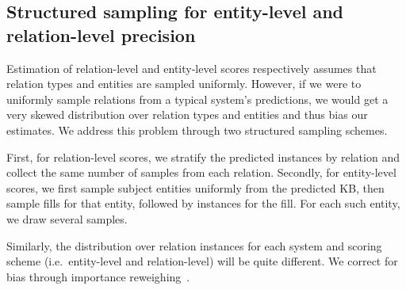 \subsection{Structured sampling for entity-level and relation-level precision}
Estimation of relation-level and entity-level scores respectively assumes that relation types and entities are sampled uniformly.
However, if we were to uniformly sample relations from a typical system's predictions, 
  we would get a very skewed distribution over relation types and entities and thus bias our estimates.
We address this problem through two structured sampling schemes.

First, for relation-level scores, we stratify the predicted instances by relation and collect the same number of samples from each relation.
Secondly, for entity-level scores,  we first sample subject entities uniformly from the predicted KB, then sample fills for that entity, followed by instances for the fill.
For each such entity, we draw several samples.

Similarly, the distribution over relation instances for each system and scoring scheme (i.e.\ entity-level and relation-level) will be quite different. We correct for bias through importance reweighing~\citep{}.
